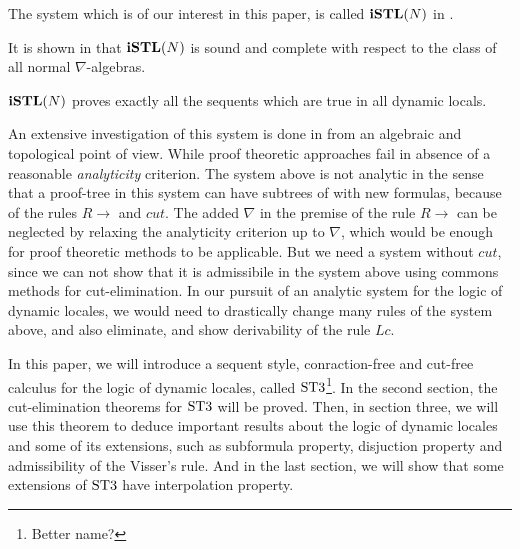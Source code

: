 \documentclass[a4paper, 12pt]{amsart}
\begin{document}
The system which is of our interest in this paper, is called $\mathbf{iSTL}(N)$ in \cite{amir}.

\vspace*{1cm}

It is shown in \cite{amir} that $\mathbf{iSTL}(N)$ is sound and complete with respect to the class of all normal $\nabla$-algebras.
\begin{thm}
  $\mathbf{iSTL}(N)$ proves exactly all the sequents which are true in all dynamic locals.
\end{thm}
An extensive investigation of this system is done in \cite{amir} from an algebraic and topological point of view. While proof theoretic approaches fail in absence of a reasonable \emph{analyticity} criterion. The system above is not analytic in the sense that a proof-tree in this system can have subtrees of with new formulas, because of the rules $R \rightarrow$ and $cut$. The added $\nabla$ in the premise of the rule $R \rightarrow$ can be neglected by relaxing the analyticity criterion up to $\nabla$, which would be enough for proof theoretic methods to be applicable. But we need a system without $cut$, since we can not show that it is admissibile in the system above using commons methods for cut-elimination. In our pursuit of an analytic system for the logic of dynamic locales, we would need to drastically change many rules of the system above, and also eliminate, and show derivability of the rule $Lc$.

In this paper, we will introduce a sequent style, conraction-free and cut-free calculus for the logic of dynamic locales, called $\text{ST3}$\footnote{\red Better name?}.
In the second section, the cut-elimination theorems for $\text{ST3}$ will be proved. Then, in section three, we will use this theorem to deduce important results about the logic of dynamic locales and some of its extensions, such as subformula property, disjuction property and admissibility of the Visser's rule.
And in the last section, we will show that some extensions of $\text{ST3}$ have interpolation property.



\end{document}
